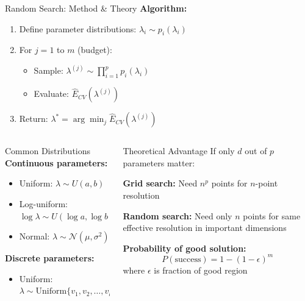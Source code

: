 \documentclass[8pt,aspectratio=1610]{beamer}
\begin{document}
\begin{frame}{Random Search: Method \& Theory}
\textbf{Algorithm:}
\begin{enumerate}
\setlength{\itemsep}{3pt}
\item Define parameter distributions: $\lambda_i \sim p_i(\lambda_i)$
\item For $j = 1$ to $m$ (budget):
\begin{itemize}
\item Sample: $\lambda^{(j)} \sim \prod_{i=1}^p p_i(\lambda_i)$
\item Evaluate: $\hat{E}_{CV}(\lambda^{(j)})$
\end{itemize}
\item Return: $\lambda^* = \arg\min_j \hat{E}_{CV}(\lambda^{(j)})$
\end{enumerate}

\vspace{0.3cm}

\begin{columns}[t]
\begin{column}{0.48\textwidth}
\begin{block}{Common Distributions}
\textbf{Continuous parameters:}
\begin{itemize}
\item Uniform: $\lambda \sim U(a, b)$
\item Log-uniform: $\log \lambda \sim U(\log a, \log b)$
\item Normal: $\lambda \sim \mathcal{N}(\mu, \sigma^2)$
\end{itemize}

\textbf{Discrete parameters:}
\begin{itemize}
\item Uniform: $\lambda \sim \text{Uniform}\{v_1, v_2, \ldots, v_k\}$
\end{itemize}
\end{block}
\end{column}

\begin{column}{0.48\textwidth}
\begin{block}{Theoretical Advantage}
If only $d$ out of $p$ parameters matter:

\textbf{Grid search:} Need $n^p$ points for $n$-point resolution

\textbf{Random search:} Need only $n$ points for same effective resolution in important dimensions

\textbf{Probability of good solution:}
$$P(\text{success}) = 1 - (1 - \epsilon)^m$$
where $\epsilon$ is fraction of good region
\end{block}
\end{column}
\end{columns}
\end{frame}
\end{document}

